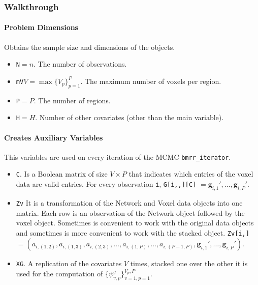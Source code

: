 \documentclass[
]{article}
\providecommand{\tightlist}{%
  \setlength{\itemsep}{0pt}\setlength{\parskip}{0pt}}
\begin{document}
\subsubsection{Walkthrough}\label{walkthrough}

\paragraph{Problem Dimensions}\label{problem-dimensions}

Obtains the sample size and dimensions of the objects.

\begin{itemize}
\tightlist
\item
  \texttt{N}\(=n\). The number of observations.
\item
  \texttt{mV}\(V=\max\{V_p\}_{p=1}^P\). The maximum number of voxels per region.
\item
  \texttt{P}\(=P\). The number of regions.
\item
  \texttt{H}\(=H\). Number of other covariates (other than the main variable).
\end{itemize}

\paragraph{Creates Auxiliary Variables}\label{creates-auxiliary-variables}

This variables are used on every iteration of the MCMC \texttt{bmrr\_iterator}.

\begin{itemize}
\tightlist
\item
  \texttt{C}. Is a Boolean matrix of size \(V \times P\) that indicates which entries of
  the voxel data are valid entries. For every observation \texttt{i}, \texttt{G{[}i,,{]}{[}C{]}}
  \(= {\boldsymbol g} _{i,1}',\ldots, {\boldsymbol g} _{i,P}'\).
\item
  \texttt{Zv} It is a transformation of the Network and Voxel data objects into one
  matrix. Each row is an observation of the Network object followed by the
  voxel object. Sometimes is convenient to work with the original data objects
  and sometimes is more convenient to work with the stacked object.
  \texttt{Zv{[}i,{]}}\(=(a_{i,(1,2)}, a_{i,(1, 3)}, a_{i, (2, 3)},\ldots,a_{i,(1,P)},\ldots,a_{i,(P-1,P)}, {\boldsymbol g} _{i,1}',\ldots, {\boldsymbol g} _{i,P}')\).
\item
  \texttt{XG}. A replication of the covariates \(V\) times, stacked one over the other
  it is used for the computation of \(\{\psi_{v,p}^g\}_{v=1,p=1}^{V_p,P}\).
\end{itemize}
\end{document}
